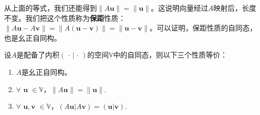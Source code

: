 \documentclass[12pt,UTF8,fontset=none]{ctexbook}
\begin{document}
从上面的等式，我们还能得到$ \| A\mathbf{u}\| = \|\mathbf{u}\|$。这说明向量经过$A$映射后，长度不变。我们把这个性质称为\textbf{保距}性质：$ \| A\mathbf{u} - A\mathbf{v}\| = \|A(\mathbf{u} - \mathbf{v})\| = \|\mathbf{u} - \mathbf{v}\|$。可以证明，保距性质的自同态，也是幺正自同构。
\begin{pp}\label{pp:8_8_1}
设$A$是配备了内积$(\,\cdot\, | \,\cdot\,)$的空间$\mathbb{V}$中的自同态，则以下三个性质等价：
\begin{enumerate}[label=\alph*.]
    \item $A$是幺正自同构。
    \item $\forall \,\, \mathbf{u}\,\, \in \mathbb{V}$，$ \| A\mathbf{u}\| = \|\mathbf{u}\|.$
    \item $\forall \,\, \mathbf{u}, \mathbf{v} \,\, \in \mathbb{V}$，$ (A\mathbf{u} | A\mathbf{v}) = (\mathbf{u}|\mathbf{v}).$
\end{enumerate}
\end{pp}
\end{document}
